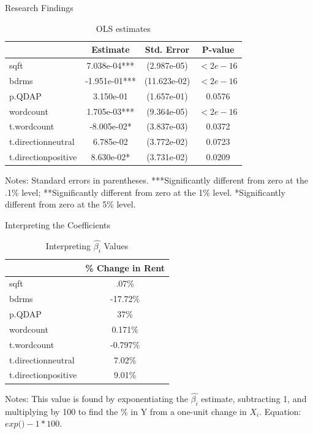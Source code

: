 \documentclass{beamer}
\begin{document}
\begin{frame}{Research Findings}

\begin{table}[ht]
\caption{OLS estimates}
\centering
\begin{threeparttable}
\begin{tabular}{lccc}
\toprule
                            & Estimate    & Std. Error & P-value \\
\midrule
sqft        & 7.038e-04***   & (2.987e-05)    & $<2e-16$    \\
bdrms  & -1.951e-01***   & (11.623e-02)   & $<2e-16$ \\
p.QDAP        &      3.150e-01 & (1.657e-01)  & 0.0576 \\
wordcount     &    1.705e-03***  & (9.364e-05)    & $<2e-16$\\
t.wordcount & -8.005e-02*  & (3.837e-03) & 0.0372 \\
t.directionneutral & 6.785e-02 & (3.772e-02) & 0.0723 \\
t.directionpositive & 8.630e-02* & (3.731e-02) & 0.0209 \\
\bottomrule
\end{tabular}
\footnotesize Notes: Standard errors in parentheses. ***Significantly different from zero at the .1\% level; **Significantly different from zero at the 1\% level. *Significantly different from zero at the 5\% level. 
\end{threeparttable}
\end{table}

\end{frame}
\begin{frame}{Interpreting the Coefficients}

\begin{table}[ht]
\caption{Interpreting $\hat{\beta_i}$ Values}
\centering
\begin{threeparttable}
\begin{tabular}{lc}
\toprule
                            & \% Change in Rent\\
\midrule
sqft        & .07\%  \\
bdrms  & -17.72\% \\
p.QDAP        &  37\% \\
wordcount     &    0.171\% \\
t.wordcount & -0.797\% \\
t.directionneutral & 7.02\% \\
t.directionpositive & 9.01\% \\
\bottomrule
\end{tabular}
\footnotesize Notes: This value is found by exponentiating the $\hat{\beta_i}$ estimate, subtracting 1, and multiplying by 100 to find the \% in Y from a one-unit change in $X_i$. Equation: $ exp($$) - 1 * 100$.
\end{threeparttable}
\end{table}
    
\end{frame}
\end{document}
